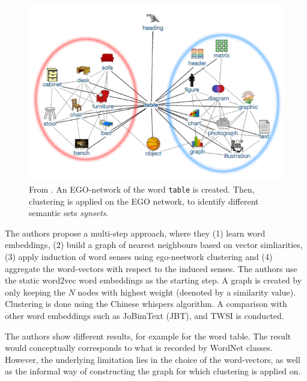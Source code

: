 \documentclass[a4paper,12pt,twoside,openright]{report}
\begin{document}
\begin{figure}[h]
	\center
  \includegraphics[width=0.6\linewidth]{./assets/relatedwork/ego_network.png}
  \caption{From \cite{pelevina16}. An EGO-network of the word \texttt{table} is created. Then, clustering is applied on the EGO network, to identify different semantic sets \textit{synsets}.}
  \label{fig:ego_network}
\end{figure}

The authors propose a multi-step approach, where they (1) learn word embeddings, (2) build a graph of nearest neighbours based on vector simliarities, (3) apply induction of word senses using ego-neetwork clustering and (4) aggregate the word-vectors with respect to the induced senses.
The authors use the static word2vec word embeddings as the starting step.
A graph is created by only keeping the $N$ nodes with highest weight (deenoted by a similarity value).
Clustering is done using the Chinese whispers algorithm.
A comparison with other word embeddings such as JoBimText (JBT), and TWSI is conducted.


The authors show different results, for example for the word table. 
The result would conceptually corresponds to what is recorded by WordNet classes.
However, the underlying limitation lies in the choice of the word-vectors, as well as the informal way of constructing the graph for which clustering is applied on.
\end{document}
